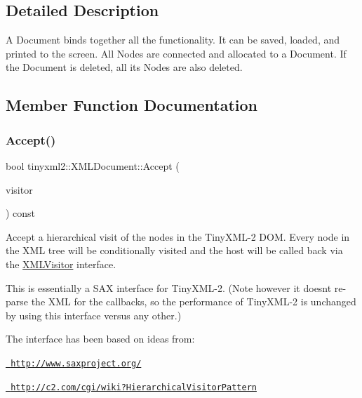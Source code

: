 \subsection{Detailed Description}
A Document binds together all the functionality. It can be saved, loaded, and printed to the screen. All Nodes are connected and allocated to a Document. If the Document is deleted, all its Nodes are also deleted. 

\subsection{Member Function Documentation}
\mbox{\label{classtinyxml2_1_1_x_m_l_document_ab7be651917a35ab1ff0e4e6d4e565cdf}} 
\subsubsection{\texorpdfstring{Accept()}{Accept()}}
{\footnotesize\ttfamily bool tinyxml2\+::\+X\+M\+L\+Document\+::\+Accept (\begin{DoxyParamCaption}\item[{\mbox{\hyperlink{classtinyxml2_1_1_x_m_l_visitor}{X\+M\+L\+Visitor}} $\ast$}]{visitor }\end{DoxyParamCaption}) const\hspace{0.3cm}{\ttfamily [virtual]}}

Accept a hierarchical visit of the nodes in the Tiny\+X\+M\+L-\/2 D\+OM. Every node in the X\+ML tree will be conditionally visited and the host will be called back via the \mbox{\hyperlink{classtinyxml2_1_1_x_m_l_visitor}{X\+M\+L\+Visitor}} interface.

This is essentially a S\+AX interface for Tiny\+X\+M\+L-\/2. (Note however it doesn\textquotesingle{}t re-\/parse the X\+ML for the callbacks, so the performance of Tiny\+X\+M\+L-\/2 is unchanged by using this interface versus any other.)

The interface has been based on ideas from\+:


\begin{DoxyItemize}
\item \href{http://www.saxproject.org/}{\texttt{ http\+://www.\+saxproject.\+org/}}
\item \href{http://c2.com/cgi/wiki?HierarchicalVisitorPattern}{\texttt{ http\+://c2.\+com/cgi/wiki?\+Hierarchical\+Visitor\+Pattern}}
\end{DoxyItemize}

